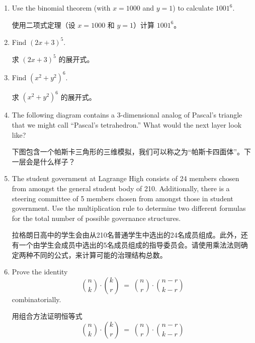 \begin{enumerate}

    \item Use the binomial theorem (with $x=1000$ and $y=1$) to calculate
    $1001^6$.
    
    \noindent 使用二项式定理（设 $x=1000$ 和 $y=1$）计算 $1001^6$。
    
    \wbvfill
    
    \item Find $(2x+3)^5$.
    
    \noindent 求 $(2x+3)^5$ 的展开式。
    
    \wbvfill
    
    \item Find $(x^2+y^2)^6$.
    
    \noindent 求 $(x^2+y^2)^6$ 的展开式。
    \wbvfill
    
    \workbookpagebreak
    
    \item The following diagram contains a 3-dimensional analog of
    Pascal's triangle that we might call ``Pascal's tetrahedron.'' 
    What would the next layer look like?
    
    \noindent 下图包含一个帕斯卡三角形的三维模拟，我们可以称之为“帕斯卡四面体”。下一层会是什么样子？
    \begin{center}
    
    \end{center}
    
    \wbvfill
    
    \item The student government at Lagrange High consists of 24 members chosen
    from amongst the general student body of 210.  Additionally, there
    is a steering committee of 5 members chosen from amongst those in
    student government. Use the multiplication rule to determine two different
    formulas for the total number of possible governance structures.
    
    \noindent 拉格朗日高中的学生会由从210名普通学生中选出的24名成员组成。此外，还有一个由学生会成员中选出的5名成员组成的指导委员会。请使用乘法法则确定两种不同的公式，来计算可能的治理结构总数。
    \wbvfill
    
    \workbookpagebreak
    
    \item Prove the identity
    \[ \binom{n}{k} \cdot \binom{k}{r} \; = \; \binom{n}{r} \cdot \binom{n-r}{k-r} \]
    combinatorially.
    
    \noindent 用组合方法证明恒等式
    \[ \binom{n}{k} \cdot \binom{k}{r} \; = \; \binom{n}{r} \cdot \binom{n-r}{k-r} \]
    

\end{enumerate}
